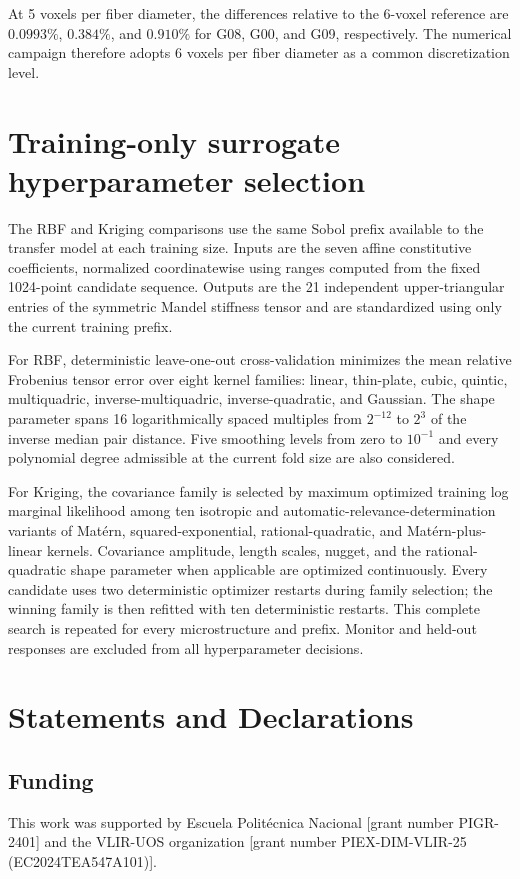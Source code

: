 \documentclass[pdflatex,sn-basic,Numbered]{sn-jnl}
\begin{document}
At 5 voxels per fiber diameter, the differences relative to the
6-voxel reference are \(0.0993\%\), \(0.384\%\), and \(0.910\%\) for
G08, G00, and G09, respectively. The numerical campaign therefore adopts
6 voxels per fiber diameter as a common discretization level.

\section{Training-only surrogate hyperparameter selection}
\label{app:surrogate_hyperparameters}

The RBF and Kriging comparisons use the same Sobol prefix available to the
transfer model at each training size. Inputs are the seven affine
constitutive coefficients, normalized coordinatewise using ranges computed
from the fixed 1024-point candidate sequence. Outputs are the 21 independent
upper-triangular entries of the symmetric Mandel stiffness tensor and are
standardized using only the current training prefix.

For RBF, deterministic leave-one-out cross-validation minimizes the mean
relative Frobenius tensor error over eight kernel families: linear,
thin-plate, cubic, quintic, multiquadric, inverse-multiquadric,
inverse-quadratic, and Gaussian. The shape parameter spans 16 logarithmically
spaced multiples from \(2^{-12}\) to \(2^3\) of the inverse median pair
distance. Five smoothing levels from zero to \(10^{-1}\) and every polynomial
degree admissible at the current fold size are also considered.

For Kriging, the covariance family is selected by maximum optimized training
log marginal likelihood among ten isotropic and
automatic-relevance-determination variants of Mat\'ern,
squared-exponential, rational-quadratic, and Mat\'ern-plus-linear kernels.
Covariance amplitude, length scales, nugget, and the rational-quadratic shape
parameter when applicable are optimized continuously. Every candidate uses
two deterministic optimizer restarts during family selection; the winning
family is then refitted with ten deterministic restarts. This complete search
is repeated for every microstructure and prefix. Monitor and held-out responses
are excluded from all hyperparameter decisions.

\section*{Statements and Declarations}

\subsection*{Funding}
This work was supported by Escuela Polit\'ecnica Nacional [grant number
PIGR-2401] and the VLIR-UOS organization [grant number
PIEX-DIM-VLIR-25 (EC2024TEA547A101)].
\end{document}
